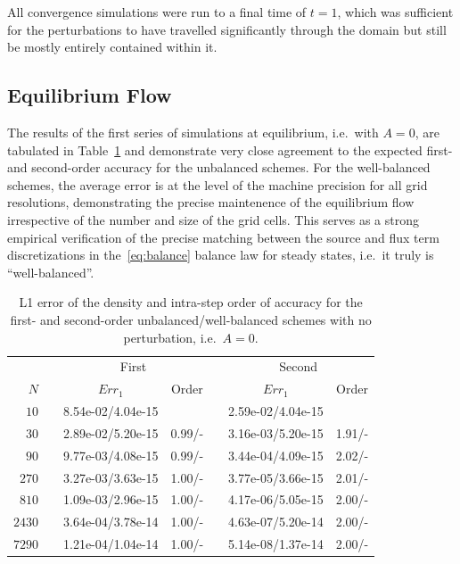 All convergence simulations were run to a final time of $t=1$, which was sufficient for the perturbations to have travelled significantly through the domain but still be mostly entirely contained within it.

\subsection{Equilibrium Flow}

The results of the first series of simulations at equilibrium, i.e.\ with $A=0$, are tabulated in Table~\ref{table:OVS_A0} and demonstrate very close agreement to the expected first- and second-order accuracy for the unbalanced schemes. For the well-balanced schemes, the average error is at the level of the machine precision for all grid resolutions, demonstrating the precise maintenence of the equilibrium flow irrespective of the number and size of the grid cells. This serves as a strong empirical verification of the precise matching between the source and flux term discretizations in the~\eqref{eq:balance} balance law for steady states, i.e.\ it truly is ``well-balanced''.

\begin{table}\centering
\caption{L1 error of the density and intra-step order of accuracy for the first- and second-order unbalanced/well-balanced schemes with no perturbation, i.e.\ $A=0$.}
\label{table:OVS_A0}
\begin{tabular}{@{}rcccccc@{}}\toprule
& \phantom{a} & \multicolumn{2}{c}{First} & \phantom{ab} & \multicolumn{2}{c}{Second}\\
\cmidrule{3-4} \cmidrule{6-7}
$N$ && $Err_1$ & Order && $Err_1$ & Order\\ \midrule
$10$ && 8.54e-02/4.04e-15 &&& 2.59e-02/4.04e-15 &\\
$30$ && 2.89e-02/5.20e-15 & 0.99/- && 3.16e-03/5.20e-15 & 1.91/-\\
$90$ && 9.77e-03/4.08e-15 & 0.99/- && 3.44e-04/4.09e-15 & 2.02/-\\
$270$ && 3.27e-03/3.63e-15 & 1.00/- && 3.77e-05/3.66e-15 & 2.01/-\\
$810$ && 1.09e-03/2.96e-15 & 1.00/- && 4.17e-06/5.05e-15 & 2.00/-\\
$2430$ && 3.64e-04/3.78e-14 & 1.00/- && 4.63e-07/5.20e-14 & 2.00/-\\
$7290$ && 1.21e-04/1.04e-14 & 1.00/- && 5.14e-08/1.37e-14 & 2.00/-\\
\bottomrule
\end{tabular}
\end{table}

